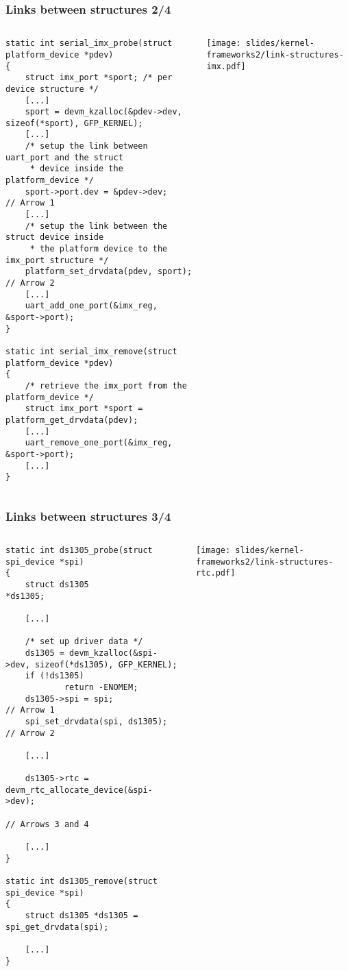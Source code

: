 \begin{frame}[fragile]
  \frametitle{Links between structures 2/4}
  \begin{columns}
    \begin{verbatim}
static int serial_imx_probe(struct platform_device *pdev)
{
    struct imx_port *sport; /* per device structure */
    [...]
    sport = devm_kzalloc(&pdev->dev, sizeof(*sport), GFP_KERNEL);
    [...]
    /* setup the link between uart_port and the struct
     * device inside the platform_device */
    sport->port.dev = &pdev->dev;                                // Arrow 1
    [...]
    /* setup the link between the struct device inside
     * the platform device to the imx_port structure */
    platform_set_drvdata(pdev, sport);                           // Arrow 2
    [...]
    uart_add_one_port(&imx_reg, &sport->port);
}

static int serial_imx_remove(struct platform_device *pdev)
{
    /* retrieve the imx_port from the platform_device */
    struct imx_port *sport = platform_get_drvdata(pdev);
    [...]
    uart_remove_one_port(&imx_reg, &sport->port);
    [...]
}
    \end{verbatim}
    \begin{center}
      \texttt{[image: slides/kernel-frameworks2/link-structures-imx.pdf]}
    \end{center}
  \end{columns}
\end{frame}

\begin{frame}[fragile]
  \frametitle{Links between structures 3/4}
  \begin{columns}
    \begin{verbatim}
static int ds1305_probe(struct spi_device *spi)
{
    struct ds1305                   *ds1305;

    [...]

    /* set up driver data */
    ds1305 = devm_kzalloc(&spi->dev, sizeof(*ds1305), GFP_KERNEL);
    if (!ds1305)
            return -ENOMEM;
    ds1305->spi = spi;                         // Arrow 1
    spi_set_drvdata(spi, ds1305);              // Arrow 2

    [...]

    ds1305->rtc = devm_rtc_allocate_device(&spi->dev); 
                                               // Arrows 3 and 4

    [...]
}

static int ds1305_remove(struct spi_device *spi)
{
    struct ds1305 *ds1305 = spi_get_drvdata(spi);

    [...]
}
    \end{verbatim}
    \begin{center}
      \texttt{[image: slides/kernel-frameworks2/link-structures-rtc.pdf]}
    \end{center}
  \end{columns}
\end{frame}

